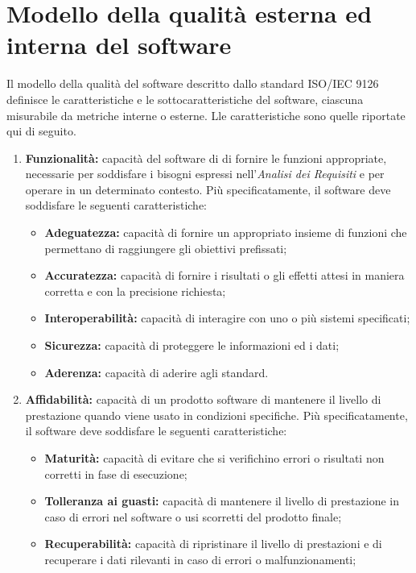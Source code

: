 \section{Modello della qualità esterna ed interna del software}\label{StandardISO/IEC9126ModelloDellaQualitàEsternaEdInternaDelSoftware}
Il modello della qualità del software descritto dallo standard ISO/IEC 9126 definisce le caratteristiche e le sottocaratteristiche del software, ciascuna misurabile da metriche interne o esterne. Lle caratteristiche sono quelle riportate qui di seguito.
\begin{enumerate}
	\item \textbf{Funzionalità:} capacità del software di di fornire le funzioni appropriate, necessarie per soddisfare i bisogni espressi nell’\textit{Analisi dei Requisiti} e per operare in un determinato contesto. Più specificatamente, il software deve soddisfare le seguenti caratteristiche:  
 	\begin{itemize}
 		\item \textbf{Adeguatezza:} capacità di fornire un appropriato insieme di funzioni che permettano di raggiungere gli obiettivi prefissati;
 		\item \textbf{Accuratezza:} capacità di fornire i risultati o gli effetti attesi in maniera corretta e con la precisione richiesta;
 		\item \textbf{Interoperabilità:} capacità di interagire con uno o più sistemi specificati;
 		\item \textbf{Sicurezza:} capacità di proteggere le informazioni ed i dati;
 		\item \textbf{Aderenza:} capacità di aderire agli standard.
 	\end{itemize}
 	\item \textbf{Affidabilità:} capacità di un prodotto software di mantenere il livello di prestazione quando viene usato in condizioni specifiche. Più specificatamente, il software deve soddisfare le seguenti caratteristiche: 
 	\begin{itemize}
 		\item \textbf{Maturità:} capacità di evitare che si verifichino errori o risultati non corretti in fase di esecuzione;
 		\item \textbf{Tolleranza ai guasti:} capacità di mantenere il livello di prestazione in caso di errori nel software o usi scorretti del prodotto finale;
 		\item \textbf{Recuperabilità:} capacità di ripristinare il livello di prestazioni e di recuperare i dati rilevanti in caso di errori o malfunzionamenti;

\end{itemize}
\end{enumerate}
